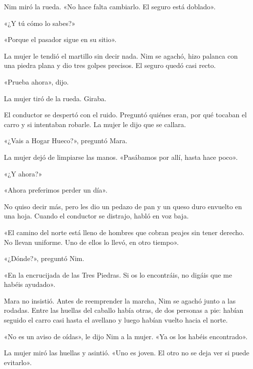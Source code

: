 \documentclass[10pt,a4paper]{article}
\begin{document}
Nim miró la rueda. «No hace falta cambiarlo. El seguro está doblado».

«¿Y tú cómo lo sabes?»

«Porque el pasador sigue en su sitio».

La mujer le tendió el martillo sin decir nada. Nim se agachó, hizo palanca con una piedra plana y dio tres golpes precisos. El seguro quedó casi recto.

«Prueba ahora», dijo.

La mujer tiró de la rueda. Giraba.

El conductor se despertó con el ruido. Preguntó quiénes eran, por qué tocaban el carro y si intentaban robarle. La mujer le dijo que se callara.

«¿Vais a Hogar Hueco?», preguntó Mara.

La mujer dejó de limpiarse las manos. «Pasábamos por allí, hasta hace poco».

«¿Y ahora?»

«Ahora preferimos perder un día».

No quiso decir más, pero les dio un pedazo de pan y un queso duro envuelto en una hoja. Cuando el conductor se distrajo, habló en voz baja.

«El camino del norte está lleno de hombres que cobran peajes sin tener derecho. No llevan uniforme. Uno de ellos lo llevó, en otro tiempo».

«¿Dónde?», preguntó Nim.

«En la encrucijada de las Tres Piedras. Si os lo encontráis, no digáis que me habéis ayudado».

Mara no insistió. Antes de reemprender la marcha, Nim se agachó junto a las rodadas. Entre las huellas del caballo había otras, de dos personas a pie: habían seguido el carro casi hasta el avellano y luego habían vuelto hacia el norte.

«No es un aviso de oídas», le dijo Nim a la mujer. «Ya os los habéis encontrado».

La mujer miró las huellas y asintió. «Uno es joven. El otro no se deja ver si puede evitarlo».
\end{document}
